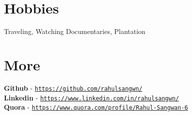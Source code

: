 \documentclass[margin, centered]{res}
\begin{document}
\begin{resume}
\section{Hobbies}
Traveling, Watching Documentaries, Plantation
\vspace{3mm}


\section{More}
\textbf{Github} - \href{https://github.com/rahulsangwn}{\texttt{https://github.com/rahulsangwn/}} \\
\textbf{Linkedin} - \href{https://www.linkedin.com/in/rahulsangwn/}{\texttt{https://www.linkedin.com/in/rahulsangwn/}} \\
\textbf{Quora} - \href{https://www.quora.com/profile/Rahul-Sangwan-6}{\texttt{https://www.quora.com/profile/Rahul-Sangwan-6}}


\end{resume}
\end{document}
